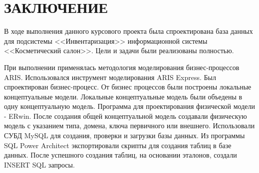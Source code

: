 {}
\section*{ЗАКЛЮЧЕНИЕ}

В ходе выполнения данного курсового проекта была спроектирована база данных
для подсистемы <<Инвентаризация>> информационной системы <<Косметический салон>>.
Цели и задачи были реализованы полностью.

При выполнении применялась методология моделирования бизнес-процессов ARIS.
Использовался инструмент моделирования ARIS Express.
Был спроектирован бизнес-процесс.
От бизнес процессов были построены локальные концептуальные модели.
Локальные концептуальные модель были объедены в одну концептуальную модель.
Программа для проектирования физической модели - ERwin.
После создания общей концептуальной модель создавали физическую модель с указанием
типа, домена, ключа первичного или внешнего.
Использовали СУБД MySQL для создания, проверки и загрузки базы данных.
Из программы SQL Power Architect экспортировали скрипты для создания таблиц в базе данных.
После успешного создания таблиц, на основании эталонов, создали INSERT SQL запросы.

\newpage
